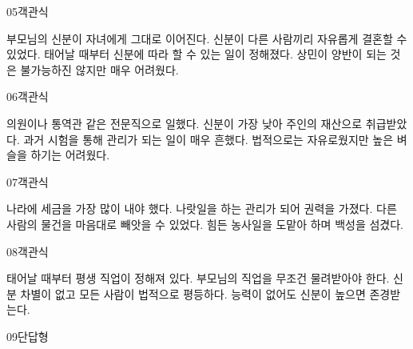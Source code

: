 \documentclass[fs95,seriesFre]{korfarm-base}
\begin{document}
\begin{kfQBlock}{05}{객관식}
\begin{kfChoices}
\kfChoice 부모님의 신분이 자녀에게 그대로 이어진다.
\kfChoice 신분이 다른 사람끼리 자유롭게 결혼할 수 있었다.
\kfChoice 태어날 때부터 신분에 따라 할 수 있는 일이 정해졌다.
\kfChoice 상민이 양반이 되는 것은 불가능하진 않지만 매우 어려웠다.
\end{kfChoices}
\end{kfQBlock}
\begin{kfQBlock}{06}{객관식}
\begin{kfChoices}
\kfChoice 의원이나 통역관 같은 전문직으로 일했다.
\kfChoice 신분이 가장 낮아 주인의 재산으로 취급받았다.
\kfChoice 과거 시험을 통해 관리가 되는 일이 매우 흔했다.
\kfChoice 법적으로는 자유로웠지만 높은 벼슬을 하기는 어려웠다.
\end{kfChoices}
\end{kfQBlock}
\begin{kfQBlock}{07}{객관식}
\begin{kfChoices}
\kfChoice 나라에 세금을 가장 많이 내야 했다.
\kfChoice 나랏일을 하는 관리가 되어 권력을 가졌다.
\kfChoice 다른 사람의 물건을 마음대로 빼앗을 수 있었다.
\kfChoice 힘든 농사일을 도맡아 하며 백성을 섬겼다.
\end{kfChoices}
\end{kfQBlock}
\begin{kfQBlock}{08}{객관식}
\begin{kfChoices}
\kfChoice 태어날 때부터 평생 직업이 정해져 있다.
\kfChoice 부모님의 직업을 무조건 물려받아야 한다.
\kfChoice 신분 차별이 없고 모든 사람이 법적으로 평등하다.
\kfChoice 능력이 없어도 신분이 높으면 존경받는다.
\end{kfChoices}
\end{kfQBlock}
\begin{kfQBlock}{09}{단답형}
\end{kfQBlock}
\end{document}
